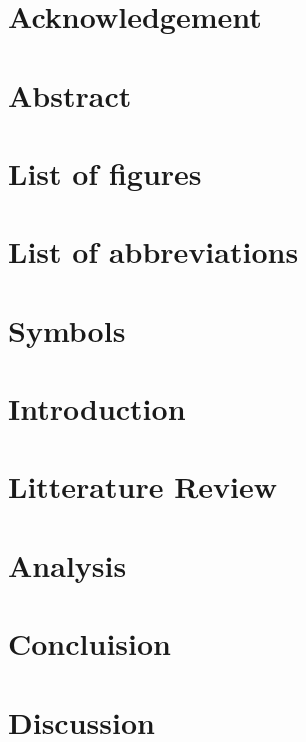 \documentclass{report}
\begin{document}
\chapter*{Acknowledgement}

\chapter*{Abstract}


\chapter*{List of figures}

\chapter*{List of abbreviations}

\chapter*{Symbols}


\tableofcontents


\chapter{Introduction}


\chapter{Litterature Review}


\chapter{Analysis}

\chapter{Concluision}

\chapter{Discussion}








\printbibliography
\end{document}
